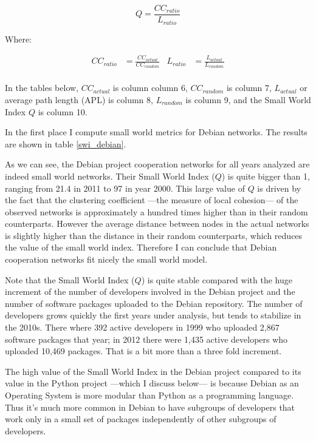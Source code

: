 \begin{equation}
Q = \frac{CC_{ratio}}{L_{ratio}}
\end{equation}

Where:

\begin{align}
CC_{ratio}& = \frac{CC_{actual}}{CC_{random}} &
L_{ratio}& = \frac{L_{actual}}{L_{random}} \nonumber \\
\end{align}

In the tables below, $CC_{actual}$ is column column 6, $CC_{random}$ is column 7, $L_{actual}$ or average path length (APL) is column 8, $L_{random}$ is column 9, and the Small World Index $Q$ is column 10.

In the first place I compute small world metrics for Debian networks. The results are shown in table \ref{swi_debian}.



As we can see, the Debian project cooperation networks for all years analyzed are indeed small world networks. Their Small World Index ($Q$) is quite bigger than 1, ranging from 21.4 in 2011 to 97 in year 2000. This large value of $Q$ is driven by the fact that the clustering coefficient ---the measure of local cohesion--- of the observed networks is approximately a hundred times higher than in their random counterparts. However the average distance between nodes in the actual networks is slightly higher than the distance in their random counterparts, which reduces the value of the small world index. Therefore I can conclude that Debian cooperation networks fit nicely the small world model. 

Note that the Small World Index ($Q$) is quite stable compared with the huge increment of the number of developers involved in the Debian project and the number of software packages uploaded to the Debian repository. The number of developers grows quickly the first years under analysis, but tends to stabilize in the 2010s. There where 392 active developers in 1999 who uploaded 2,867 software packages that year; in 2012 there were 1,435 active developers who uploaded 10,469 packages. That is a bit more than a three fold increment.

The high value of the Small World Index in the Debian project compared to its value in the Python project ---which I discuss below--- is because Debian as an Operating System is more modular than Python as a programming language. Thus it's much more common in Debian to have subgroups of developers that work only in a small set of packages independently of other subgroups of developers.

